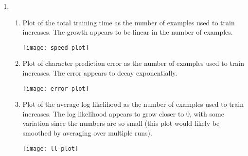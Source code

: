 \documentclass[12pt]{article}
\begin{document}
\begin{enumerate}

\item %
\begin{enumerate}

\item %
Plot of the total training time as the number of examples used to train increases. The growth appears to be linear in the number of examples.

\begin{center}
\texttt{[image: speed-plot]}
\end{center}

\item %
Plot of character prediction error as the number of examples used to train increases. The error appears to decay exponentially.

\begin{center}
\texttt{[image: error-plot]}
\end{center}

\item %
Plot of the average log likelihood as the number of examples used to train increases. The log likelihood appears to grow closer to 0, with some variation since the numbers are so small (this plot would likely be smoothed by averaging over multiple runs).

\begin{center}
\texttt{[image: ll-plot]}
\end{center}

\end{enumerate}
\end{enumerate}
\end{document}
